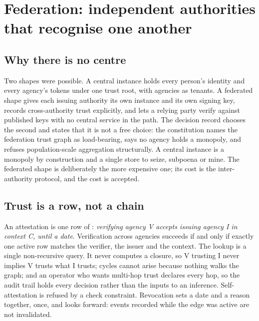 \section{Federation: independent authorities that recognise one another}
\label{sec:federation}



\subsection{Why there is no centre}

Two shapes were possible. A central instance holds every person's identity and every agency's
tokens under one trust root, with agencies as tenants. A federated shape gives each issuing
authority its own instance and its own signing key, records cross-authority trust explicitly, and
lets a relying party verify against published keys with no central service in the path. The
decision record chooses the second and states that it is not a free choice: the constitution names
the federation trust graph as load-bearing, says no agency holds a monopoly, and refuses
population-scale aggregation structurally. A central instance is a monopoly by construction and a
single store to seize, subpoena or mine. The federated shape is deliberately the more expensive one;
its cost is the inter-authority protocol, and the cost is accepted. \sImpl

\subsection{Trust is a row, not a chain}

An attestation is one row of : \emph{verifying agency V accepts
issuing agency I in context C, until a date}. Verification across agencies succeeds if and only if
exactly one active row matches the verifier, the issuer and the context. The lookup is a single
non-recursive query. It never computes a closure, so V trusting I never implies V trusts what I
trusts; cycles cannot arise because nothing walks the graph; and an operator who wants multi-hop
trust declares every hop, so the audit trail holds every decision rather than the inputs to an
inference. Self-attestation is refused by a check constraint. Revocation sets a date and a reason
together, once, and looks forward: events recorded while the edge was active are not invalidated.
\sImpl

